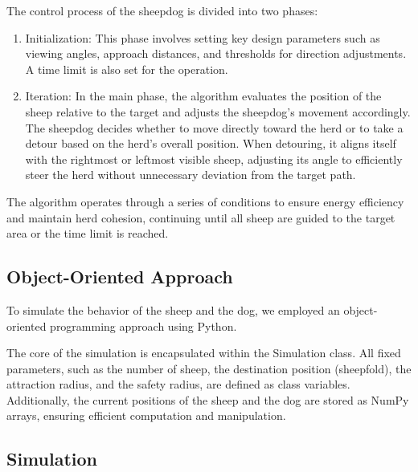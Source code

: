 \documentclass[9pt]{pnas-new}
\begin{document}
The control process of the sheepdog is divided into two phases:
\begin{enumerate}
    \item Initialization: This phase involves setting key design parameters such as viewing angles, approach distances, and thresholds for direction adjustments. A time limit is also set for the operation.
    \item Iteration: In the main phase, the algorithm evaluates the position of the sheep relative to the target and adjusts the sheepdog's movement accordingly. The sheepdog decides whether to move directly toward the herd or to take a detour based on the herd's overall position. When detouring, it aligns itself with the rightmost or leftmost visible sheep, adjusting its angle to efficiently steer the herd without unnecessary deviation from the target path.
\end{enumerate}

The algorithm operates through a series of conditions to ensure energy efficiency and maintain herd cohesion, continuing until all sheep are guided to the target area or the time limit is reached.


\subsection*{Object-Oriented Approach}
To simulate the behavior of the sheep and the dog, we employed an object-oriented programming approach
using Python.

The core of the simulation is encapsulated within the Simulation class.
All fixed parameters, such as the number of sheep, the destination position (sheepfold),
the attraction radius, and the safety radius, are defined as class variables.
Additionally, the current positions of the sheep and the dog are stored as NumPy arrays,
ensuring efficient computation and manipulation.

\subsection*{Simulation}
\end{document}
